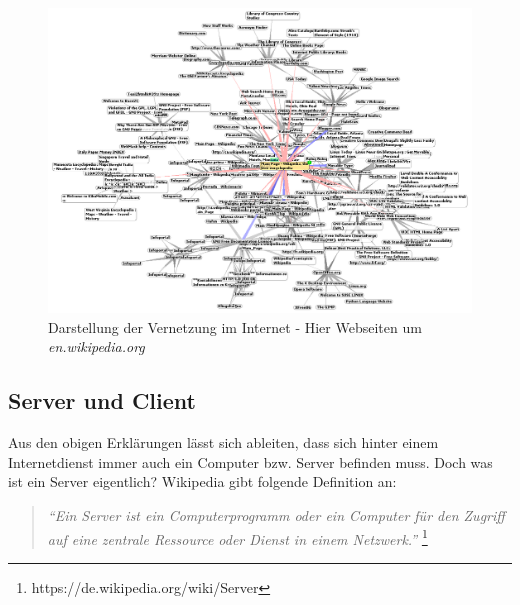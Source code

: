 \begin{figure}[H]
\centering
\includegraphics[scale=0.4]{images/wikipedia_www}
\caption{Darstellung der Vernetzung im Internet - Hier Webseiten um \textit{en.wikipedia.org}}
\end{figure}

\subsection{Server und Client}
Aus den obigen Erklärungen lässt sich ableiten, dass sich hinter einem Internetdienst immer auch ein Computer bzw. Server befinden muss.
Doch was ist ein Server eigentlich? Wikipedia gibt folgende Definition an:

\begin{quote}
\textit{``Ein Server ist ein Computerprogramm oder ein Computer für den Zugriff auf eine zentrale Ressource oder Dienst in einem Netzwerk.''}
\footnote{https://de.wikipedia.org/wiki/Server}
\end{quote}

